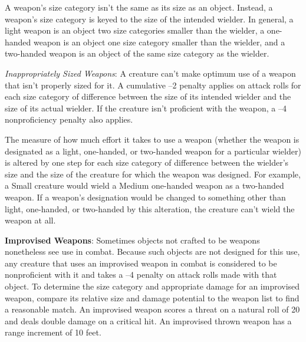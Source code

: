 A weapon's size category isn't the same as its size as an object. Instead, a weapon's size category is keyed to the size of the intended wielder. In general, a light weapon is an object two size categories smaller than the wielder, a one-handed weapon is an object one size category smaller than the wielder, and a two-handed weapon is an object of the same size category as the wielder.
		
\textit{Inappropriately Sized Weapons}: A creature can't make optimum use of a weapon that isn't properly sized for it. A cumulative --2 penalty applies on attack rolls for each size category of difference between the size of its intended wielder and the size of its actual wielder. If the creature isn't proficient with the weapon, a --4 nonproficiency penalty also applies.
		
The measure of how much effort it takes to use a weapon (whether the weapon is designated as a light, one-handed, or two-handed weapon for a particular wielder) is altered by one step for each size category of difference between the wielder's size and the size of the creature for which the weapon was designed. For example, a Small creature would wield a Medium one-handed weapon as a two-handed weapon. If a weapon's designation would be changed to something other than light, one-handed, or two-handed by this alteration, the creature can't wield the weapon at all.
		
\textbf{Improvised Weapons}: Sometimes objects not crafted to be weapons nonetheless see use in combat. Because such objects are not designed for this use, any creature that uses an improvised weapon in combat is considered to be nonproficient with it and takes a --4 penalty on attack rolls made with that object. To determine the size category and appropriate damage for an improvised weapon, compare its relative size and damage potential to the weapon list to find a reasonable match. An improvised weapon scores a threat on a natural roll of 20 and deals double damage on a critical hit. An improvised thrown weapon has a range increment of 10 feet.
		
